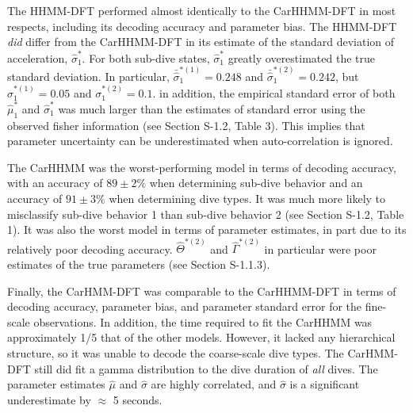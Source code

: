 The HHMM-DFT performed almost identically to the CarHHMM-DFT in most respects, including its decoding accuracy and parameter bias. 
The HHMM-DFT \textit{did} differ from the CarHHMM-DFT in its estimate of the standard deviation of acceleration, $\hat \sigma_1^*$. For both sub-dive states, $\hat \sigma_1^*$ greatly overestimated the true standard deviation. In particular, $\bar \hat \sigma_1^{*(1)} = 0.248$ and $\bar \hat \sigma_1^{*(2)} = 0.242$, but $\sigma_1^{*(1)} = 0.05$ and $\sigma_1^{*(2)} = 0.1$. in addition, the empirical standard error of both $\hat \mu_1^*$ and $\hat \sigma_1^*$ was much larger than the estimates of standard error using the observed fisher information (see Section S-1.2, Table 3). This implies that parameter uncertainty can be underestimated when auto-correlation is ignored.

The CarHHMM was the worst-performing model in terms of decoding accuracy, with an accuracy of $89 \pm 2\%$ when determining sub-dive behavior and an accuracy of $91 \pm 3\%$ when determining dive types. It was much more likely to misclassify sub-dive behavior 1 than sub-dive behavior 2 (see Section S-1.2, Table 1). It was also the worst model in terms of parameter estimates, in part due to its relatively poor decoding accuracy. $\hat \Theta^{*(2)}$ and $\hat \Gamma^{*(2)}$ in particular were poor estimates of the true parameters (see Section S-1.1.3).

Finally, the CarHMM-DFT was comparable to the CarHHMM-DFT in terms of decoding accuracy, parameter bias, and parameter standard error for the fine-scale observations. In addition, the time required to fit the CarHHMM was approximately 1/5 that of the other models. However, it lacked any hierarchical structure, so it was unable to decode the coarse-scale dive types. The CarHMM-DFT still did fit a gamma distribution to the dive duration of \textit{all} dives. The parameter estimates $\hat \mu$ and $\hat \sigma$ are highly correlated, and $\hat \sigma$ is a significant underestimate by $\approx$ 5 seconds.







